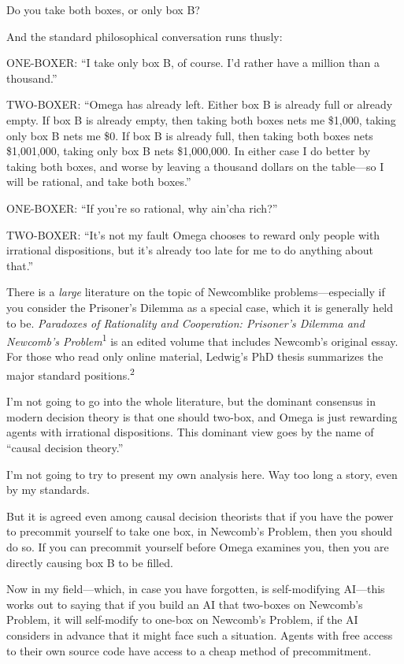 {
 Do you take both boxes, or only box B?}

{
 And the standard philosophical conversation runs thusly:}

{
 ONE-BOXER: ``I take only box B, of course.
I'd rather have a million than a
thousand.''}

{
 TWO-BOXER: ``Omega has already left. Either box B
is already full or already empty. If box B is already empty, then
taking both boxes nets me \$1,000, taking only box B nets me \$0. If
box B is already full, then taking both boxes nets \$1,001,000, taking
only box B nets \$1,000,000. In either case I do better by taking both
boxes, and worse by leaving a thousand dollars on the table---so I will
be rational, and take both boxes.''}

{
 ONE-BOXER: ``If you're so
rational, why ain'cha rich?''}

{
 TWO-BOXER: ``It's not my fault
Omega chooses to reward only people with irrational dispositions, but
it's already too late for me to do anything about
that.''}

{
 There is a \textit{large} literature on the topic of Newcomblike
problems---especially if you consider the Prisoner's
Dilemma as a special case, which it is generally held to be.
\textit{Paradoxes of Rationality and Cooperation:
Prisoner's Dilemma and Newcomb's
Problem}\textsuperscript{1} is an edited volume that includes
Newcomb's original essay. For those who read only
online material, Ledwig's PhD thesis summarizes the
major standard positions.\textsuperscript{2}}

{
 I'm not going to go into the whole literature, but
the dominant consensus in modern decision theory is that one should
two-box, and Omega is just rewarding agents with irrational
dispositions. This dominant view goes by the name of
``causal decision theory.''}

{
 I'm not going to try to present my own analysis
here. Way too long a story, even by my standards.}

{
 But it is agreed even among causal decision theorists that if you
have the power to precommit yourself to take one box, in
Newcomb's Problem, then you should do so. If you can
precommit yourself before Omega examines you, then you are directly
causing box B to be filled.}

{
 Now in my field---which, in case you have forgotten, is
self-modifying AI---this works out to saying that if you build an AI
that two-boxes on Newcomb's Problem, it will
self-modify to one-box on Newcomb's Problem, if the AI
considers in advance that it might face such a situation. Agents with
free access to their own source code have access to a cheap method of
precommitment.}

